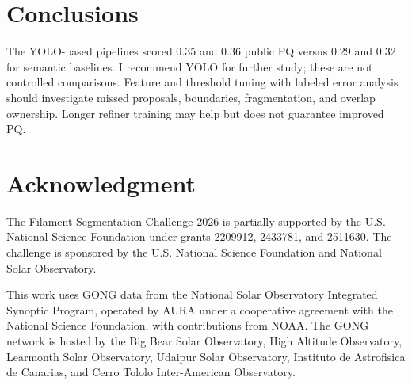 \documentclass[sigconf]{acmart}
\begin{document}
\section{Conclusions}
The YOLO-based pipelines scored 0.35 and 0.36 public PQ versus 0.29 and
0.32 for semantic baselines. I recommend YOLO for further study; these are
not controlled comparisons. Feature and threshold tuning with labeled error
analysis should investigate missed proposals, boundaries, fragmentation, and
overlap ownership. Longer refiner training may help but does not guarantee
improved PQ.

\section{Acknowledgment}
The Filament Segmentation Challenge 2026 is partially supported by the U.S.
National Science Foundation under grants 2209912, 2433781, and 2511630.
The challenge is sponsored by the U.S. National Science Foundation and
National Solar Observatory.

This work uses GONG data from the National Solar Observatory Integrated
Synoptic Program, operated by AURA under a cooperative agreement with the
National Science Foundation, with contributions from NOAA. The GONG network
is hosted by the Big Bear Solar Observatory, High Altitude Observatory,
Learmonth Solar Observatory, Udaipur Solar Observatory, Instituto de
Astrofisica de Canarias, and Cerro Tololo Inter-American Observatory.



\end{document}
